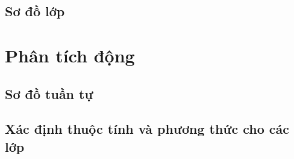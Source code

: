 \documentclass[12pt]{book}
\begin{document}
  \section{Sơ đồ lớp}

\chapter{Phân tích động}

  \section{Sơ đồ tuần tự}

  \section{Xác định thuộc tính và phương thức cho các lớp}


\chapter{}

\begin{thebibliography}{9}
\end{thebibliography}
\end{document}
